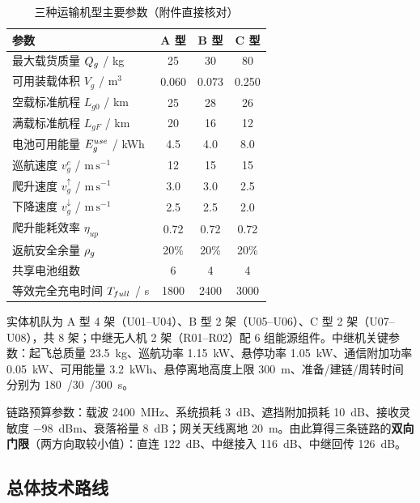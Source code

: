 \begin{table}[htbp]
	\caption{三种运输机型主要参数（附件直接核对）}
	\label{tab:uav}
	\centering
	\begin{tabular}{lccc}
		\toprule
		参数 & A 型 & B 型 & C 型 \\
		\midrule
		最大载货质量 $Q_{g}$ / kg            & 25   & 30   & 80   \\
		可用装载体积 $V_{g}$ / $\mathrm{m^3}$ & 0.060 & 0.073 & 0.250 \\
		空载标准航程 $L_{g0}$ / km          & 25   & 28   & 26   \\
		满载标准航程 $L_{gF}$ / km          & 20   & 16   & 12   \\
		电池可用能量 $E_{g}^{use}$ / kWh          & 4.5  & 4.0  & 8.0  \\
		巡航速度 $v_{g}^{c}$ / $\mathrm{m\,s^{-1}}$   & 12   & 15   & 15   \\
		爬升速度 $v_{g}^{\uparrow}$ / $\mathrm{m\,s^{-1}}$ & 3.0 & 3.0 & 2.5 \\
		下降速度 $v_{g}^{\downarrow}$ / $\mathrm{m\,s^{-1}}$ & 2.5 & 2.5 & 2.0 \\
		爬升能耗效率 $\eta_{up}$            & 0.72 & 0.72 & 0.72 \\
		返航安全余量 $\rho_{g}$                & 20\% & 20\% & 20\% \\
		共享电池组数                        & 6    & 4    & 4    \\
		等效完全充电时间 $T_{full}$ / s       & 1800 & 2400 & 3000 \\
		\bottomrule
	\end{tabular}
\end{table}

实体机队为 A 型 4 架（U01--U04）、B 型 2 架（U05--U06）、C 型 2 架（U07--U08），共 8 架；中继无人机 2 架（R01--R02）配 6 组能源组件。中继机关键参数：起飞总质量 \SI{23.5}{kg}、巡航功率 \SI{1.15}{kW}、悬停功率 \SI{1.05}{kW}、通信附加功率 \SI{0.05}{kW}、可用能量 \SI{3.2}{kWh}、悬停离地高度上限 \SI{300}{m}、准备/建链/周转时间分别为 \SI{180}{/}\SI{30}{/}\SI{300}{s}。

链路预算参数：载波 \SI{2400}{MHz}、系统损耗 \SI{3}{dB}、遮挡附加损耗 \SI{10}{dB}、接收灵敏度 \SI{-98}{dBm}、衰落裕量 \SI{8}{dB}；网关天线离地 \SI{20}{m}。由此算得三条链路的\textbf{双向门限}（两方向取较小值）：直连 \SI{122}{dB}、中继接入 \SI{116}{dB}、中继回传 \SI{126}{dB}。

\subsection{总体技术路线}

